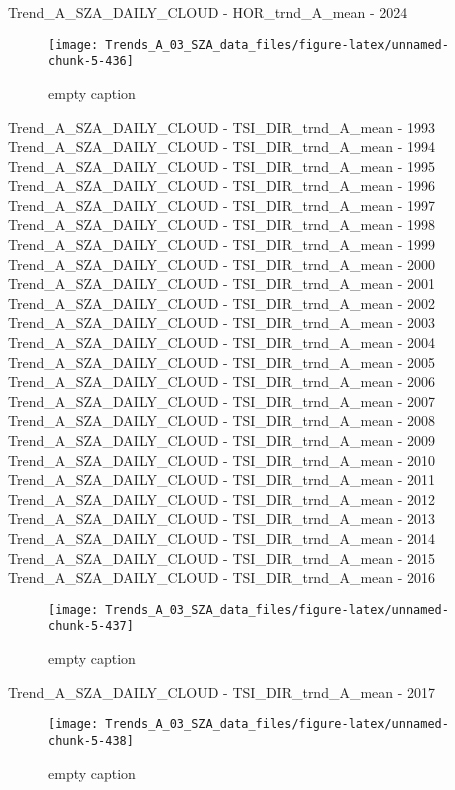 \documentclass[
  10pt,
  a4paper,oneside]{article}
\begin{document}
Trend\_A\_SZA\_DAILY\_CLOUD - HOR\_trnd\_A\_mean - 2024

\begin{figure}[!ht]

{\centering \texttt{[image: Trends\_A\_03\_SZA\_data\_files/figure-latex/unnamed-chunk-5-436]} 

}

\caption{ empty caption }\label{fig:unnamed-chunk-5-436}
\end{figure}

Trend\_A\_SZA\_DAILY\_CLOUD - TSI\_DIR\_trnd\_A\_mean - 1993
Trend\_A\_SZA\_DAILY\_CLOUD - TSI\_DIR\_trnd\_A\_mean - 1994
Trend\_A\_SZA\_DAILY\_CLOUD - TSI\_DIR\_trnd\_A\_mean - 1995
Trend\_A\_SZA\_DAILY\_CLOUD - TSI\_DIR\_trnd\_A\_mean - 1996
Trend\_A\_SZA\_DAILY\_CLOUD - TSI\_DIR\_trnd\_A\_mean - 1997
Trend\_A\_SZA\_DAILY\_CLOUD - TSI\_DIR\_trnd\_A\_mean - 1998
Trend\_A\_SZA\_DAILY\_CLOUD - TSI\_DIR\_trnd\_A\_mean - 1999
Trend\_A\_SZA\_DAILY\_CLOUD - TSI\_DIR\_trnd\_A\_mean - 2000
Trend\_A\_SZA\_DAILY\_CLOUD - TSI\_DIR\_trnd\_A\_mean - 2001
Trend\_A\_SZA\_DAILY\_CLOUD - TSI\_DIR\_trnd\_A\_mean - 2002
Trend\_A\_SZA\_DAILY\_CLOUD - TSI\_DIR\_trnd\_A\_mean - 2003
Trend\_A\_SZA\_DAILY\_CLOUD - TSI\_DIR\_trnd\_A\_mean - 2004
Trend\_A\_SZA\_DAILY\_CLOUD - TSI\_DIR\_trnd\_A\_mean - 2005
Trend\_A\_SZA\_DAILY\_CLOUD - TSI\_DIR\_trnd\_A\_mean - 2006
Trend\_A\_SZA\_DAILY\_CLOUD - TSI\_DIR\_trnd\_A\_mean - 2007
Trend\_A\_SZA\_DAILY\_CLOUD - TSI\_DIR\_trnd\_A\_mean - 2008
Trend\_A\_SZA\_DAILY\_CLOUD - TSI\_DIR\_trnd\_A\_mean - 2009
Trend\_A\_SZA\_DAILY\_CLOUD - TSI\_DIR\_trnd\_A\_mean - 2010
Trend\_A\_SZA\_DAILY\_CLOUD - TSI\_DIR\_trnd\_A\_mean - 2011
Trend\_A\_SZA\_DAILY\_CLOUD - TSI\_DIR\_trnd\_A\_mean - 2012
Trend\_A\_SZA\_DAILY\_CLOUD - TSI\_DIR\_trnd\_A\_mean - 2013
Trend\_A\_SZA\_DAILY\_CLOUD - TSI\_DIR\_trnd\_A\_mean - 2014
Trend\_A\_SZA\_DAILY\_CLOUD - TSI\_DIR\_trnd\_A\_mean - 2015
Trend\_A\_SZA\_DAILY\_CLOUD - TSI\_DIR\_trnd\_A\_mean - 2016

\begin{figure}[!ht]

{\centering \texttt{[image: Trends\_A\_03\_SZA\_data\_files/figure-latex/unnamed-chunk-5-437]} 

}

\caption{ empty caption }\label{fig:unnamed-chunk-5-437}
\end{figure}

Trend\_A\_SZA\_DAILY\_CLOUD - TSI\_DIR\_trnd\_A\_mean - 2017

\begin{figure}[!ht]

{\centering \texttt{[image: Trends\_A\_03\_SZA\_data\_files/figure-latex/unnamed-chunk-5-438]} 

}

\caption{ empty caption }\label{fig:unnamed-chunk-5-438}
\end{figure}
\end{document}
